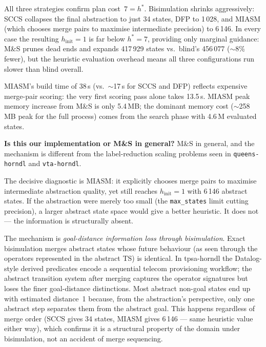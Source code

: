 \documentclass[11pt,a4paper]{article}
\begin{document}
    All three strategies confirm plan cost~$7 = h^*$.  Bisimulation shrinks
    aggressively: SCCS collapses the final abstraction to just 34 states,
    DFP to 1\,028, and MIASM (which chooses merge pairs to maximise
    intermediate precision) to 6\,146.  In every case the resulting
    $h_{\mathrm{init}} = 1$ is far below $h^* = 7$, providing only marginal
    guidance: M\&S prunes dead ends and expands 417\,929 states vs.\
    blind's 456\,077 ($\sim$8\% fewer), but the heuristic evaluation
    overhead means all three configurations run slower than blind overall.

    MIASM's build time of 38\,s (vs.\ $\sim$17\,s for SCCS and DFP)
    reflects expensive merge-pair scoring: the very first scoring pass
    alone takes 13.5\,s.  MIASM peak memory increase from M\&S is only
    5.4\,MB; the dominant memory cost ($\sim$258\,MB peak for the
    full process) comes from the search phase with 4.6\,M evaluated states.

    \textbf{Is this our implementation or M\&S in general?}  M\&S in
    general, and the mechanism is different from the label-reduction
    scaling problems seen in \texttt{queens-horndl} and
    \texttt{vta-horndl}.

    The decisive diagnostic is MIASM: it explicitly chooses merge pairs to
    maximise intermediate abstraction quality, yet still reaches
    $h_{\mathrm{init}} = 1$ with 6\,146 abstract states.  If the
    abstraction were merely too small (the \texttt{max\_states} limit
    cutting precision), a larger abstract state space would give a better
    heuristic.  It does not — the information is structurally absent.

    The mechanism is \emph{goal-distance information loss through
    bisimulation}.  Exact bisimulation merges abstract states whose
    future behaviour (as seen through the operators represented in the
    abstract TS) is identical.  In tpsa-horndl the Datalog-style derived
    predicates encode a sequential telecom provisioning workflow; the
    abstract transition system after merging captures the operator
    signatures but loses the finer goal-distance distinctions.  Most
    abstract non-goal states end up with estimated distance~1 because,
    from the abstraction's perspective, only one abstract step separates
    them from the abstract goal.  This happens regardless of merge order
    (SCCS gives 34 states, MIASM gives 6\,146 — same heuristic value
    either way), which confirms it is a structural property of the domain
    under bisimulation, not an accident of merge sequencing.
\end{document}
